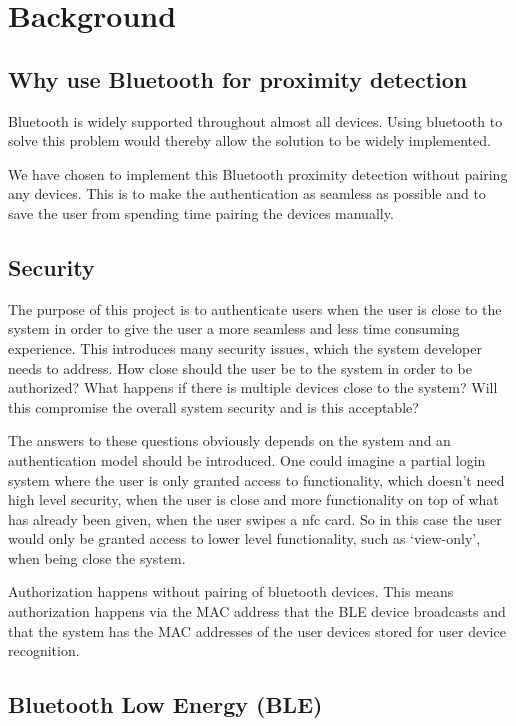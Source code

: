 \section{Background}

\subsection{Why use Bluetooth for proximity detection}

Bluetooth is widely supported throughout almost all devices.
Using bluetooth to solve this problem would thereby allow the solution to be widely implemented.

We have chosen to implement this Bluetooth proximity detection without pairing any devices.
This is to make the authentication as seamless as possible and to save the user from spending time pairing the devices manually.

\subsection{Security}

The purpose of this project is to authenticate users when the user is close to the system in order to give the user a more seamless and less time consuming experience.
This introduces many security issues, which the system developer needs to address.
How close should the user be to the system in order to be authorized? What happens if there is multiple devices close to the system? Will this compromise the overall system security and is this acceptable?

The answers to these questions obviously depends on the system and an authentication model should be introduced.
One could imagine a partial login system where the user is only granted access to functionality, which doesn’t need high level security, when the user is close and more functionality on top of what has already been given, when the user swipes a nfc card.
So in this case the user would only be granted access to lower level functionality, such as ‘view-only’, when being close the system.

Authorization happens without pairing of bluetooth devices.
This means authorization happens via the MAC address that the BLE device broadcasts and that the system has the MAC addresses of the user devices stored for user device recognition.

\subsection{Bluetooth Low Energy (BLE)}

